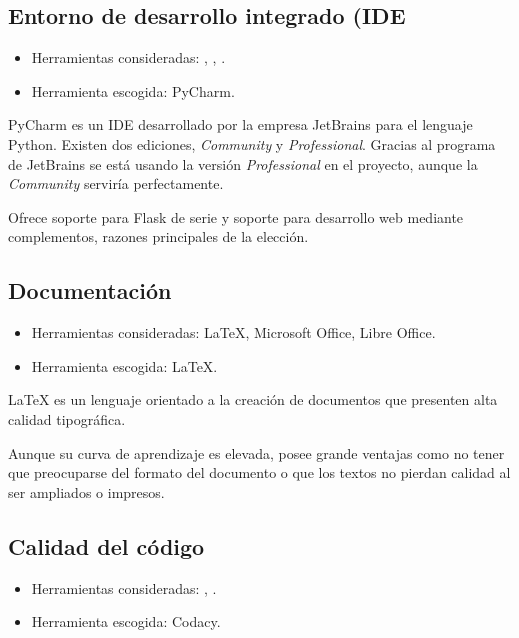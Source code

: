 \subsection{Entorno de desarrollo integrado (IDE}

\begin{itemize}
	\tightlist
	\item Herramientas consideradas:
	,
	,
	.
	\item Herramienta escogida: PyCharm.
\end{itemize}

PyCharm es un IDE desarrollado por la empresa JetBrains para el lenguaje Python.
Existen dos ediciones, \textit{Community} y \textit{Professional}. Gracias al
programa  de
JetBrains se está usando la versión \textit{Professional} en el proyecto, aunque
la \textit{Community} serviría perfectamente.

Ofrece soporte para Flask de serie y soporte para desarrollo web mediante
complementos, razones principales de la elección.

\subsection{Documentación}

\begin{itemize}
	\tightlist
	\item Herramientas consideradas: \LaTeX, Microsoft Office, Libre Office.
	\item Herramienta escogida: \LaTeX{}.
\end{itemize}

\LaTeX{} es un lenguaje orientado a la creación de documentos que presenten alta
calidad tipográfica.

Aunque su curva de aprendizaje es elevada, posee grande ventajas como no tener
que preocuparse del formato del documento o que los textos no pierdan calidad al
ser ampliados o impresos.

\subsection{Calidad del código}

\begin{itemize}
	\tightlist
	\item Herramientas consideradas:
	,
	.
	\item Herramienta escogida: Codacy.
\end{itemize}

